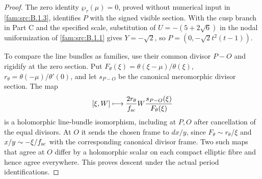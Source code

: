 \begin{proof}
The zero identity $\wp_\tau(\mu)=0$, proved without numerical input in \ref{fam:src:B.1.3}, identifies $P$ with the signed visible section. With the cusp branch in Part C and the specified scale, substitution of $U=-(5+2\sqrt6)$ in the nodal uniformization of \ref{fam:src:B.1.1} gives $Y=-\sqrt2$, so $P=(0,-\sqrt2t^2(t-1))$.

To compare the line bundles as families, use their common divisor $P-O$ and rigidify at the zero section. Put $F_\theta(\xi)=\theta(\xi-\mu)/\theta(\xi)$, $r_\theta=\theta(-\mu)/\theta'(0)$, and let $s_{P-O}$ be the canonical meromorphic divisor section. The map
\[
 [\xi,W]\longmapsto\frac{2r_\theta}{f_{\rm sc}}
        W\frac{s_{P-O}(\xi)}{F_\theta(\xi)}
\]
is a holomorphic line-bundle isomorphism, including at $P,O$ after cancellation of the equal divisors. At $O$ it sends the chosen frame to $dx/y$, since $F_\theta\sim r_\theta/\xi$ and $x/y\sim-\xi/f_{\rm sc}$ with the corresponding canonical divisor frame. Two such maps that agree at $O$ differ by a holomorphic scalar on each compact elliptic fibre and hence agree everywhere. This proves descent under the actual period identifications.


\end{proof}
